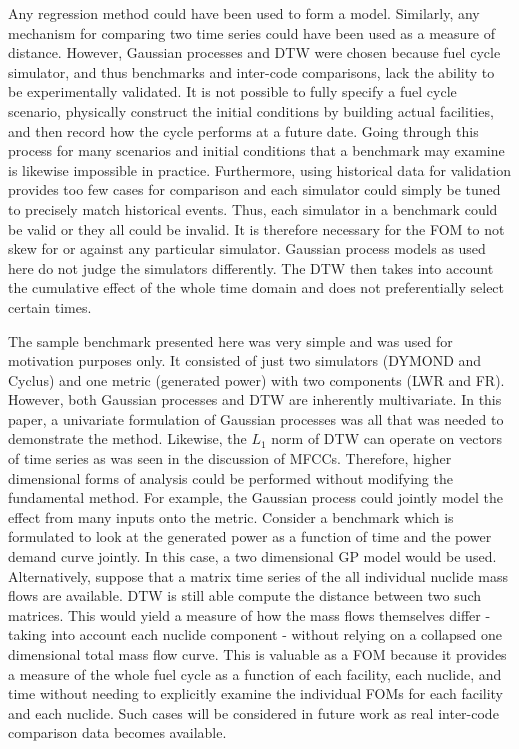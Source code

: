 \documentclass{ntmanuscript}
\begin{document}
Any regression method could have been used to form a model. Similarly, any
mechanism for comparing two time series could have been used as a measure
of distance.  However, Gaussian processes and DTW were chosen because
fuel cycle simulator, and thus benchmarks and inter-code comparisons, lack
the ability to be experimentally validated.
It is not possible to fully specify a fuel cycle scenario,
physically construct the initial conditions by building actual facilities,
and then record how the cycle performs at a future date.
Going through this process for many scenarios and initial conditions that
a benchmark may examine is likewise impossible in practice.
Furthermore, using
historical data for validation provides too few cases for comparison and
each simulator could simply be tuned to precisely match historical events.
Thus, each simulator in a benchmark could be valid or they all could be
invalid. It is therefore necessary for the FOM to not skew for or against
any particular simulator. Gaussian process models as used here do not
judge the simulators differently. The DTW then takes into account the
cumulative effect of the whole time domain and does not preferentially
select certain times.

The sample benchmark presented here was very simple and was used for motivation
purposes only. It consisted of just
two simulators (DYMOND and Cyclus) and one metric (generated power) with
two components (LWR and FR).  However, both Gaussian processes and DTW
are inherently multivariate. In this paper, a univariate formulation of
Gaussian processes was all that was needed to demonstrate the method.
Likewise,
the $L_1$ norm of DTW can operate on vectors of time series as was seen
in the discussion of MFCCs. Therefore, higher dimensional forms of analysis could
be performed without modifying the fundamental method. For example, the Gaussian process could jointly model the
effect from many inputs onto the metric. Consider a benchmark which is formulated
to look at the generated power as a function of time and the power demand curve
jointly.
In this case, a two dimensional GP model would be used. Alternatively,
suppose that a matrix time series of the all individual nuclide mass flows
are available. DTW is still able compute the distance between two
such matrices. This would yield a measure of how the mass flows themselves
differ - taking into account each nuclide component - without relying on a
collapsed one dimensional total mass flow curve.
This is valuable as a FOM because it provides a measure of the whole fuel
cycle as a function of each facility, each nuclide, and time
without needing to explicitly examine the individual FOMs for each facility
and each nuclide.
Such cases will be considered in
future work as real inter-code comparison data becomes available.
\end{document}
